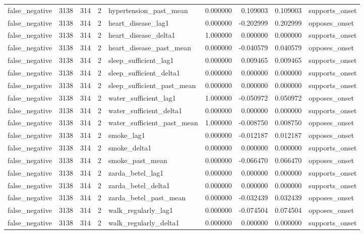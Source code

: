 \begin{longtable}{lrrrlrrrl}
false\_negative & 3138 & 314 & 2 & hypertension\_past\_mean & 0.000000 & 0.109003 & 0.109003 & supports\_onset \\
false\_negative & 3138 & 314 & 2 & heart\_disease\_lag1 & 0.000000 & -0.202999 & 0.202999 & opposes\_onset \\
false\_negative & 3138 & 314 & 2 & heart\_disease\_delta1 & 1.000000 & 0.000000 & 0.000000 & supports\_onset \\
false\_negative & 3138 & 314 & 2 & heart\_disease\_past\_mean & 0.000000 & -0.040579 & 0.040579 & opposes\_onset \\
false\_negative & 3138 & 314 & 2 & sleep\_sufficient\_lag1 & 0.000000 & 0.009465 & 0.009465 & supports\_onset \\
false\_negative & 3138 & 314 & 2 & sleep\_sufficient\_delta1 & 0.000000 & 0.000000 & 0.000000 & supports\_onset \\
false\_negative & 3138 & 314 & 2 & sleep\_sufficient\_past\_mean & 0.000000 & 0.000000 & 0.000000 & supports\_onset \\
false\_negative & 3138 & 314 & 2 & water\_sufficient\_lag1 & 1.000000 & -0.050972 & 0.050972 & opposes\_onset \\
false\_negative & 3138 & 314 & 2 & water\_sufficient\_delta1 & 0.000000 & 0.000000 & 0.000000 & supports\_onset \\
false\_negative & 3138 & 314 & 2 & water\_sufficient\_past\_mean & 1.000000 & -0.008750 & 0.008750 & opposes\_onset \\
false\_negative & 3138 & 314 & 2 & smoke\_lag1 & 0.000000 & -0.012187 & 0.012187 & opposes\_onset \\
false\_negative & 3138 & 314 & 2 & smoke\_delta1 & 0.000000 & 0.000000 & 0.000000 & supports\_onset \\
false\_negative & 3138 & 314 & 2 & smoke\_past\_mean & 0.000000 & -0.066470 & 0.066470 & opposes\_onset \\
false\_negative & 3138 & 314 & 2 & zarda\_betel\_lag1 & 0.000000 & 0.000000 & 0.000000 & supports\_onset \\
false\_negative & 3138 & 314 & 2 & zarda\_betel\_delta1 & 0.000000 & 0.000000 & 0.000000 & supports\_onset \\
false\_negative & 3138 & 314 & 2 & zarda\_betel\_past\_mean & 0.000000 & -0.032439 & 0.032439 & opposes\_onset \\
false\_negative & 3138 & 314 & 2 & walk\_regularly\_lag1 & 0.000000 & -0.074504 & 0.074504 & opposes\_onset \\
false\_negative & 3138 & 314 & 2 & walk\_regularly\_delta1 & 0.000000 & 0.000000 & 0.000000 & supports\_onset \\

\end{longtable}
